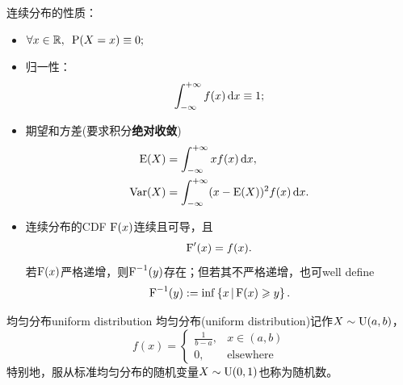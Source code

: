 \begin{corollary}
	连续分布的性质：
	\begin{itemize}
		\item $\forall x\in\mathbb R,\enspace\operatorname{P}(X=x)\equiv 0;$
		\item 归一性：
			\begin{equation}
				\int_{-\infty}^{+\infty} f(x)\mathop{}\!\mathrm{d} x\equiv 1;
			\end{equation}
		\item 期望和方差(要求积分\textbf{绝对收敛})
			\begin{subequations}
				\begin{align}
					\operatorname{E}(X)&=\int_{-\infty}^{+\infty} xf(x)\mathop{}\!\mathrm{d} x,\\
					\operatorname{Var}(X)&=\int_{-\infty}^{+\infty}(x-\operatorname{E}(X))^2f(x)\mathop{}\!\mathrm{d} x.
				\end{align}
			\end{subequations}
		\item 连续分布的CDF $\operatorname{F}(x)$连续且可导，且
			\begin{equation}
				\operatorname{F}'(x)=f(x).
			\end{equation}
			若$\operatorname{F}(x)$严格递增，则$\operatorname{F}^{-1}(y)$存在；但若其不严格递增，也可well define
			\begin{equation}
				\label{eq:CDF-1}
				\operatorname{F}^{-1}(y):=\inf\left\{x\,\middle\vert\,\operatorname{F}(x)\geqslant y\right\}.
			\end{equation}
	\end{itemize}
\end{corollary}

\begin{definition}{均匀分布}{uniform distribution}
	均匀分布(uniform distribution)记作$X\sim\operatorname{U}(a,b)$，%
	\begin{equation}
		f(x)=\begin{cases}
			\frac1{b-a},&x\in(a,b)\\
			0,&\text{elsewhere}
		\end{cases}
	\end{equation}
	特别地，服从标准均匀分布的随机变量$X\sim\operatorname{U}(0,1)$也称为随机数。
\end{definition}
